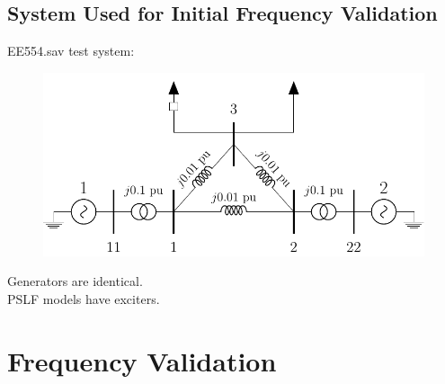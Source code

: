 \documentclass[14pt, unknownkeysallowed]{beamer}
\begin{document}
\subsection{System Used for Initial Frequency Validation}
\begin{frame}
EE554.sav test system:
\vspace{-1em}\\
\begin{figure}
	\includegraphics[width=\linewidth]{cicuitEE554}
\end{figure}
\vspace{-1em}
Generators are identical. \\PSLF models have exciters.
\end{frame}

\section{Frequency Validation}
\end{document}
